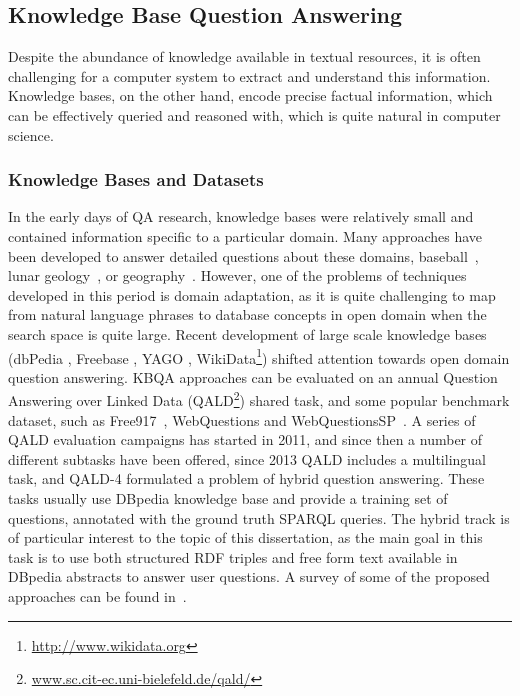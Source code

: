 \subsection{Knowledge Base Question Answering}
\label{section:relatedwork:factoid:kbqa}

Despite the abundance of knowledge available in textual resources, it is often challenging for a computer system to extract and understand this information.
Knowledge bases, on the other hand, encode precise factual information, which can be effectively queried and reasoned with, which is quite natural in computer science.

\subsubsection{Knowledge Bases and Datasets}
\label{section:relatedwork:factoid:kbqa:data}

In the early days of QA research, knowledge bases were relatively small and contained information specific to a particular domain.
Many approaches have been developed to answer detailed questions about these domains, \eg baseball~\cite{green1961baseball}, lunar geology~\cite{woods1977lunar}, or geography~\cite{zelle1996learning}.
However, one of the problems of techniques developed in this period is domain adaptation, as it is quite challenging to map from natural language phrases to database concepts in open domain when the search space is quite large.
Recent development of large scale knowledge bases (\eg dbPedia \cite{auer2007dbpedia}, Freebase \cite{Bollacker:2008:FCC:1376616.1376746}, YAGO \cite{suchanek2007yago}, WikiData\footnote{\href{url}{http://www.wikidata.org}}) shifted attention towards open domain question answering.
KBQA approaches can be evaluated on an annual Question Answering over Linked Data (QALD\footnote{\href{url}{www.sc.cit-ec.uni-bielefeld.de/qald/}}) shared task, and some popular benchmark dataset, such as Free917~\cite{CaiY13}, WebQuestions \cite{BerantCFL13:sempre} and WebQuestionsSP~\cite{yih2016webquestionssp}.
A series of QALD evaluation campaigns has started in 2011, and since then a number of different subtasks have been offered, \ie since 2013 QALD includes a multilingual task, and QALD-4 formulated a problem of hybrid question answering.
These tasks usually use DBpedia knowledge base and provide a training set of questions, annotated with the ground truth SPARQL queries.
The hybrid track is of particular interest to the topic of this dissertation, as the main goal in this task is to use both structured RDF triples and free form text available in DBpedia abstracts to answer user questions.
A survey of some of the proposed approaches can be found in~\cite{unger2014introduction}.

